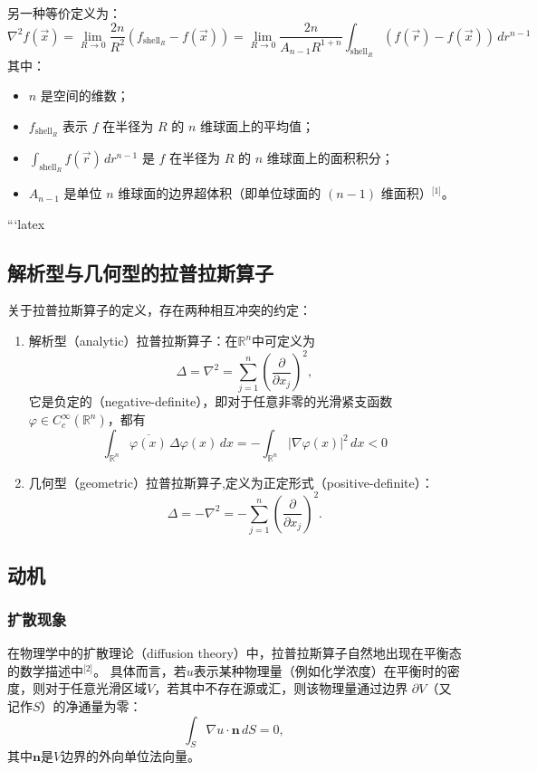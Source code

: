 另一种等价定义为：
\[
\nabla^{2} f(\vec{x})
= \lim_{R \to 0} \frac{2n}{R^{2}} \left(f_{\text{shell}_{R}} - f(\vec{x})\right)
= \lim_{R \to 0} \frac{2n}{A_{n-1} R^{1+n}}
\int_{\text{shell}_{R}} \left( f(\vec{r}) - f(\vec{x}) \right) \, d r^{n-1}~
\]
其中：
\begin{itemize}
  \item $n$ 是空间的维数；
  \item $f_{\text{shell}_{R}}$ 表示 $f$ 在半径为 $R$ 的 $n$ 维球面上的平均值；
  \item $\displaystyle \int_{\text{shell}_{R}} f(\vec{r}) \, d r^{n-1}$ 是 $f$ 在半径为 $R$ 的 $n$ 维球面上的面积积分；
  \item $A_{n-1}$ 是单位 $n$ 维球面的边界超体积（即单位球面的 $(n-1)$ 维面积）\(^\text{[1]}\)。
\end{itemize}
```latex
\subsection{解析型与几何型的拉普拉斯算子}
关于拉普拉斯算子的定义，存在两种相互冲突的约定：
\begin{enumerate}
  \item 解析型（analytic）拉普拉斯算子：在$\mathbb{R}^{n}$中可定义为
  \[
  \Delta = \nabla^{2} = \sum_{j=1}^{n} \left( \frac{\partial}{\partial x_{j}} \right)^{2},~
  \]
  它是负定的（negative-definite），即对于任意非零的光滑紧支函数 $\varphi \in C_{c}^{\infty}(\mathbb{R}^{n})$，都有
  \[
  \int_{\mathbb{R}^{n}} \overline{\varphi(x)} \, \Delta \varphi(x) \, dx
  = - \int_{\mathbb{R}^{n}} |\nabla \varphi(x)|^{2} \, dx < 0~
  \]
  \item 几何型（geometric）拉普拉斯算子,定义为正定形式（positive-definite）：
  \[
  \Delta = -\nabla^{2}
  = - \sum_{j=1}^{n} \left( \frac{\partial}{\partial x_{j}} \right)^{2}.~
  \]
\end{enumerate}
\subsection{动机}
\subsubsection{扩散现象}
在物理学中的扩散理论（diffusion theory）中，拉普拉斯算子自然地出现在平衡态的数学描述中\(^\text{[2]}\)。  具体而言，若$u$表示某种物理量（例如化学浓度）在平衡时的密度，则对于任意光滑区域$V$，若其中不存在源或汇，则该物理量通过边界 $\partial V$（又记作$S$）的净通量为零：
\[
\int_{S} \nabla u \cdot \mathbf{n} \, dS = 0,~
\]
其中$\mathbf{n}$是$V$边界的外向单位法向量。

